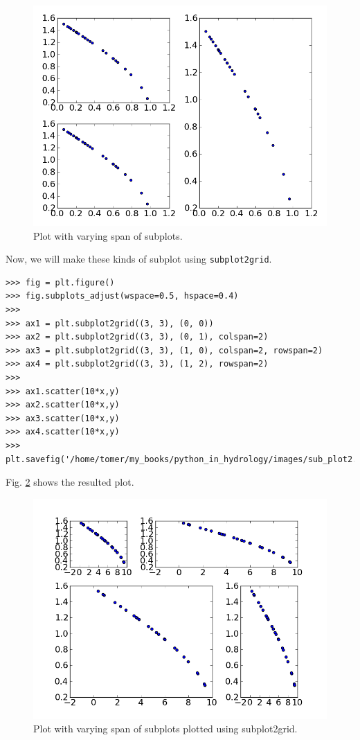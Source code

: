 \documentclass[10pt]{book}
\begin{document}
\beforefig
\begin{figure}[h!]
  \centering
    \includegraphics[scale=0.5]{images/sub_plot1.png}
  \caption{Plot with varying span of subplots.}
   \label{fig:subplot1}
\end{figure}
\afterfig

Now, we will make these kinds of subplot using \verb"subplot2grid". 
\beforeverb \begin{verbatim}
>>> fig = plt.figure()
>>> fig.subplots_adjust(wspace=0.5, hspace=0.4)
>>> 
>>> ax1 = plt.subplot2grid((3, 3), (0, 0))
>>> ax2 = plt.subplot2grid((3, 3), (0, 1), colspan=2)
>>> ax3 = plt.subplot2grid((3, 3), (1, 0), colspan=2, rowspan=2)
>>> ax4 = plt.subplot2grid((3, 3), (1, 2), rowspan=2)
>>> 
>>> ax1.scatter(10*x,y)
>>> ax2.scatter(10*x,y)
>>> ax3.scatter(10*x,y)
>>> ax4.scatter(10*x,y)
>>> plt.savefig('/home/tomer/my_books/python_in_hydrology/images/sub_plot2.png')
\end{verbatim} \afterverb
Fig. \ref{fig:subplot2} shows the resulted plot.

\beforefig
\begin{figure}[h!]
  \centering
    \includegraphics[scale=0.5]{images/sub_plot2.png}
  \caption{Plot with varying span of subplots plotted using subplot2grid.}
   \label{fig:subplot2}
\end{figure}
\afterfig
\end{document}
